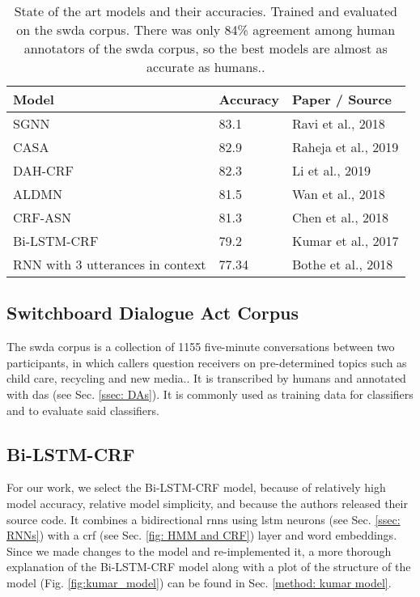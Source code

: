     \begin{table}[ht]
    \centering
    \begin{tabular}{|l|l|l|}
    \hline
    \textbf{Model}                   & \textbf{Accuracy} & \textbf{Paper / Source}      \\ \hline
    SGNN                             & 83.1              & Ravi et al., 2018 \cite{ravi2018self}   \\ \hline
    CASA                             & 82.9              & Raheja et al., 2019\cite{raheja2019dialogue} \\ \hline
    DAH-CRF                          & 82.3              & Li et al., 2019 \cite{li2018dual}     \\ \hline
    ALDMN                            & 81.5              & Wan et al., 2018 \cite{wan2018improved}    \\ \hline
    CRF-ASN                          & 81.3              & Chen et al., 2018 \cite{chen2018dialogue}   \\ \hline
    Bi-LSTM-CRF                      & 79.2              & Kumar et al., 2017 \cite{kumar2017dialogue}  \\ \hline
    RNN with 3 utterances in context & 77.34             & Bothe et al., 2018 \cite{bothe2018context}  \\ \hline
    \end{tabular}
    \caption{State of the art \glspl{model} and their accuracies. Trained and evaluated on the \gls{swda} corpus. There was only 84\% agreement among human annotators of the \gls{swda} corpus, so the best \glspl{model} are almost as accurate as humans.\cite{swda}.}
    \label{table: da models}
    \end{table}

    \subsection{Switchboard Dialogue Act Corpus \label{ssec: swda}}
        The \gls{swda} corpus is a collection of 1155 five-minute conversations between two participants, in which callers question receivers on pre-determined topics such as child care, recycling and new media.\cite{fang2012annotation}. It is transcribed by humans and annotated with \glspl{da} (see Sec. \ref{ssec: DAs}). It is commonly used as training data for classifiers and to evaluate said classifiers.

    \subsection{Bi-LSTM-CRF \label{sssec: kumar model}}
    For our work, we select the Bi-LSTM-CRF \gls{model}\cite{kumar2017dialogue}, because of relatively high \gls{model} accuracy, relative \gls{model} simplicity, and because the authors released their source code. It combines a bidirectional \glspl{rnn} using \gls{lstm} \glspl{neuron} (see Sec. \ref{ssec: RNNs}) with a \gls{crf} (see Sec. \ref{fig: HMM and CRF}) layer and word \glspl{embedding}. Since we made changes to the \gls{model} and re-implemented it, a more thorough explanation of the Bi-LSTM-CRF \gls{model} along with a plot of the structure of the \gls{model} (Fig. \ref{fig:kumar_model}) can be found in Sec. \ref{method: kumar model}.

